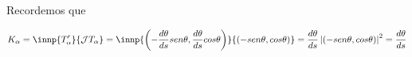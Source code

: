 \documentclass{article}
\begin{document}
\begin{dem}
    Recordemos que
    
    \begin{equation*}
        K_{\alpha}=\innp{T'_{\alpha}}{\J T_{\alpha}}=
        \innp{\left(-\dv{\theta}{s}sen\theta,\dv{\theta}{s}cos\theta\right)}
        {(-sen\theta,cos\theta)}=\dv{\theta}{s}\abs{(-sen\theta,cos\theta)}^{2}=\dv{\theta}{s}
    \end{equation*}
\end{dem}

\end{document}
